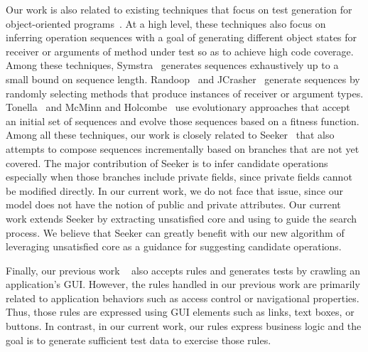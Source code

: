 Our work is also related to existing techniques that focus on test 
generation for object-oriented programs~\cite{pacheco2007,tillmann2008,thummalapenta2011, xie:symstra,
csallner:jcrasher, phil:evo, tonella:etoc}. At a high level,
these techniques also focus on inferring operation sequences 
with a goal of generating different object states for receiver
or arguments of method under test so as to achieve high code coverage.
Among these techniques, Symstra~\cite{xie:symstra} generates sequences
exhaustively up to a small bound on sequence length. 
Randoop~\cite{pacheco2007} and JCrasher~\cite{csallner:jcrasher} generate
sequences by randomly selecting methods that produce instances of receiver
or argument types. Tonella~\cite{tonella:etoc} and McMinn and Holcombe~\cite{phil:evo}
use evolutionary approaches that accept an initial set of sequences
and evolve those sequences based on a fitness function. Among all
these techniques, our work is closely related to Seeker~\cite{thummalapenta2011}
that also attempts to compose sequences incrementally based on branches that
are not yet covered. The major contribution of Seeker is to infer
candidate operations especially when those branches include private fields,
since private fields cannot be modified directly. In our current work,
we do not face that issue, since our model does not have the notion of public
and private attributes. Our current work extends Seeker by extracting
unsatisfied core and using to guide the search process. 
We believe that Seeker can greatly benefit with
our new algorithm of leveraging unsatisfied core as a guidance for suggesting
candidate operations.

Finally, our previous work \wateg{}~\cite{Thummalapenta:2013} also accepts rules 
and generates tests by crawling an application's GUI. However, the rules handled in our previous
work are primarily related to application behaviors such as access control
or navigational properties. Thus, those rules are expressed 
using GUI elements such as links, text boxes, or buttons. In contrast,
in our current work, our rules express business logic and the goal is to
generate sufficient test data to exercise those rules. 